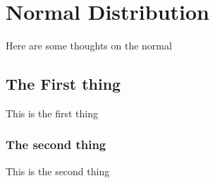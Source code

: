 \documentclass[../../main.tex]{subfiles}
\begin{document}
\chapter{Normal Distribution}
Here are some thoughts on the normal



\section{The First thing}
This is the first thing


\subsection{The second thing}
This is the second thing

 
\end{document}

